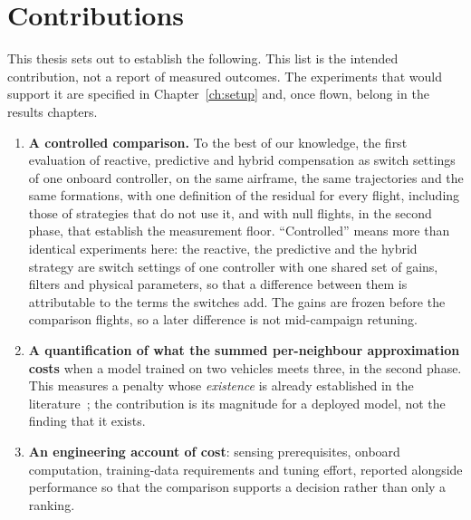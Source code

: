 \section{Contributions}
\label{sec:intro-contrib}

This thesis sets out to establish the following. This list is the intended contribution, not a
report of measured outcomes. The experiments that would support it are specified in
Chapter~\ref{ch:setup} and, once flown, belong in the results chapters.

\begin{enumerate}
  \item \textbf{A controlled comparison.} To the best of our knowledge, the first evaluation of reactive, predictive and hybrid compensation as switch settings of one
    onboard controller, on the same airframe, the same trajectories and the same formations, with one definition of the residual for every flight, including those of
    strategies that do not use it, and with null flights, in the second phase, that establish the
    measurement floor.
    ``Controlled'' means more than identical experiments here: the reactive, the predictive and the
    hybrid strategy are switch settings of one controller with one shared set of gains, filters and
    physical parameters, so that a difference between them is attributable to the terms the
    switches add. The gains are frozen before the comparison flights, so a later difference is not
    mid-campaign retuning.

  \item \textbf{A quantification of what the summed per-neighbour approximation costs} when a
    model trained on two vehicles meets three, in the second phase. This measures a penalty whose \emph{existence} is
    already established in the literature~\cite{shi2020neuralswarm,gielis2023aggregate}; the
    contribution is its magnitude for a deployed model, not the finding that it exists.

  \item \textbf{An engineering account of cost}: sensing prerequisites, onboard computation,
    training-data requirements and tuning effort, reported alongside performance so that the comparison supports a
    decision rather than only a ranking.

\end{enumerate}

